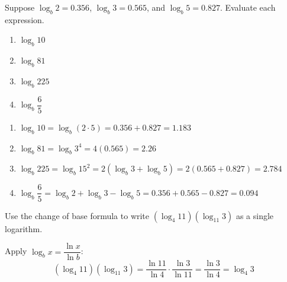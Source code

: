 \documentclass{ximera}
\begin{document}
\begin{problem}
Suppose $\log_b 2 = 0.356$, $\log_b 3 = 0.565$, and $\log_b 5 = 0.827$. Evaluate each expression.
\begin{enumerate}
  \item[(a)] $\log_b 10$
  \medskip
  \item[(b)] $\log_b 81$
  \medskip
  \item[(c)] $\log_b 225$
  \medskip
  \item[(d)] $\log_b \dfrac{6}{5}$
\end{enumerate}

\begin{solution}
\begin{enumerate}
  \item[(a)] $\log_b 10 = \log_b(2\cdot 5) = 0.356 + 0.827 = \mathbf{1.183}$

  \item[(b)] $\log_b 81 = \log_b 3^4 = 4(0.565) = \mathbf{2.26}$

  \item[(c)] $\log_b 225 = \log_b 15^2 = 2(\log_b 3 + \log_b 5) = 2(0.565+0.827) = \mathbf{2.784}$

  \item[(d)] $\log_b\dfrac{6}{5} = \log_b 2 + \log_b 3 - \log_b 5 = 0.356 + 0.565 - 0.827 = \mathbf{0.094}$
\end{enumerate}
\end{solution}
\end{problem}


\begin{problem}
Use the change of base formula to write $(\log_4 11)(\log_{11} 3)$ as a single logarithm.

\begin{solution}
Apply $\log_b x = \dfrac{\ln x}{\ln b}$:
$$(\log_4 11)(\log_{11} 3) = \frac{\ln 11}{\ln 4}\cdot\frac{\ln 3}{\ln 11} = \frac{\ln 3}{\ln 4} = \log_4 3$$
\end{solution}
\end{problem}
\end{document}
